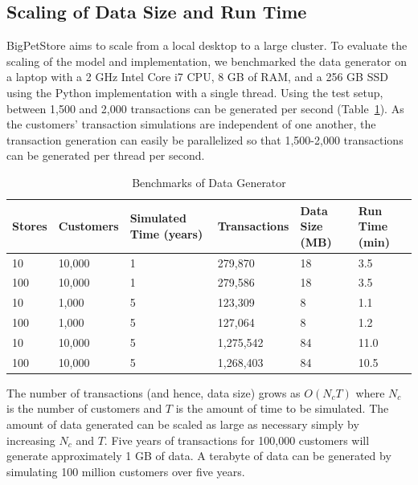 \documentclass[conference]{IEEEtran}
\begin{document}
\subsection{Scaling of Data Size and Run Time}
BigPetStore aims to scale from a local desktop to a large cluster. To evaluate the scaling of the model and implementation, we benchmarked the data generator on a laptop with a 2 GHz Intel Core i7 CPU, 8 GB of RAM, and a 256 GB SSD using the Python implementation with a single thread. Using the test setup, between 1,500 and 2,000 transactions can be generated per second (Table~\ref{tab:benchmarks}). As the customers' transaction simulations are independent of one another, the transaction generation can easily be parallelized so that 1,500-2,000 transactions can be generated per thread per second.

\begin{table}[!t]
\renewcommand{\arraystretch}{1.3}
\caption{Benchmarks of Data Generator}
\label{tab:benchmarks}
\centering
\begin{tabular}{|p{0.75cm}||p{1.2cm}||p{1cm}||p{1.25cm}||p{1cm}||p{1cm}|}
\hline
Stores & Customers & Simulated Time (years) & Transactions & Data Size (MB) & Run Time (min)\\ \hline
10 & 10,000 & 1 & 279,870 & 18 & 3.5 \\ \hline
100 & 10,000 & 1 & 279,586 & 18 & 3.5 \\ \hline
10 & 1,000 & 5 & 123,309 & 8 & 1.1 \\ \hline
100 & 1,000 & 5 & 127,064 & 8 & 1.2 \\ \hline
10 & 10,000 & 5 & 1,275,542 & 84 & 11.0 \\ \hline
100 & 10,000 & 5 & 1,268,403 & 84 & 10.5 \\ \hline
\end{tabular}
\end{table}

The number of transactions (and hence, data size) grows as $O(N_c T)$ where $N_c$ is the number of customers and $T$ is the amount of time to be simulated. The amount of data generated can be scaled as large as necessary simply by increasing $N_c$ and $T$. Five years of transactions for 100,000 customers will generate approximately 1 GB of data. A terabyte of data can be generated by simulating 100 million customers over five years. 
\end{document}
